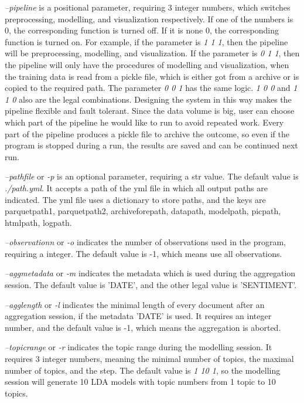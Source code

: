 \documentclass{article} %
\begin{document}
\textit{--pipeline} is a positional parameter, requiring 3 integer numbers, which switches preprocessing, modelling, and visualization respectively. If one of the numbers is 0, the corresponding function is turned off. If it is none 0, the corresponding function is turned on. For example, if the parameter is \textit{1 1 1}, then the pipeline will be preprocessing, modelling, and visualization. If the parameter is \textit{0 1 1}, then the pipeline will only have the procedures of modelling and visualization, when the training data is read from a pickle file, which is either got from a archive or is copied to the required path. The parameter \textit{0 0 1} has the same logic. \textit{1 0 0} and \textit{1 1 0} also are the legal combinations. Designing the system in this way makes the pipeline flexible and fault tolerant. Since the data volume is big, user can choose which part of the pipeline he would like to run to avoid repeated work. Every part of the pipeline produces a pickle file to archive the outcome, so even if the program is stopped during a run, the results are saved and can be continued next run.

\textit{--path\textunderscore{}file} or \textit{-p} is an optional parameter, requiring a str value. The default value is \textit{./path.yml}. It accepts a path of the yml file in which all output paths are indicated. The yml file uses a dictionary to store paths, and the keys are parquet\textunderscore{}path1, 
parquet\textunderscore{}path2, 
archive\textunderscore{}fore\textunderscore{}path, 
data\textunderscore{}path, 
model\textunderscore{}path, 
pic\textunderscore{}path, 
html\textunderscore{}path, 
log\textunderscore{}path.

\textit{--observation\textunderscore{}n} or \textit{-o} indicates the number of observations used in the program, requiring a integer. The default value is -1, which means use all observations.

\textit{--agg\textunderscore{}metadata} or \textit{-m} indicates the metadata which is used during the aggregation session. The default value is 'DATE', and the other legal value is 'SENTIMENT'.

\textit{--agg\textunderscore{}length} or \textit{-l} indicates the minimal length of every document after an aggregation session, if the metadata 'DATE' is used. It requires an integer number, and the default value is -1, which means the aggregation is aborted.

\textit{--topic\textunderscore{}range} or \textit{-r} indicates the topic range during the modelling session. It requires 3 integer numbers, meaning the minimal number of topics, the maximal number of topics, and the step. The default value is \textit{1 10 1}, so the modelling session will generate 10 LDA models with topic numbers from 1 topic to 10 topics.
\end{document}
